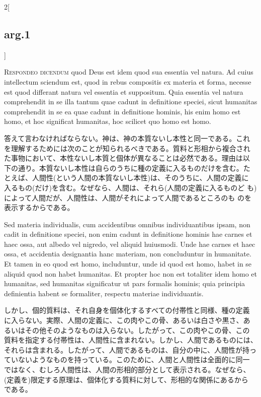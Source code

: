 \documentclass[paper=a4paper,fontsize=10pt,jafontsize=9pt,titlepage]{jlreq}
\begin{document}
\begin{paracol}{2}[\subsection{arg.1}]

\textsc{Respondeo dicendum} quod Deus est idem quod sua essentia vel
natura.  Ad cuius intellectum sciendum est, quod in rebus compositis
ex materia et forma, necesse est quod differant natura vel essentia et
suppositum.  Quia essentia vel natura comprehendit in se illa tantum
quae cadunt in definitione speciei, sicut humanitas comprehendit in se
ea quae cadunt in definitione hominis, his enim homo est homo, et hoc
significat humanitas, hoc scilicet quo homo est homo.

\switchcolumn

答えて言わなければならない。神は、神の本質ないし本性と同一である。これ
を理解するためには次のことが知られるべきである。質料と形相から複合され
た事物において、本性ないし本質と個体が異なることは必然である。理由は以
下の通り。本質ないし本性は自らのうちに種の定義に入るものだけを含む。た
とえば、人間性(という人間の本質ないし本性)は、そのうちに、人間の定義に
入るもの(だけ)を含む。なぜなら、人間は、それら(人間の定義に入るものど
も)によって人間だが、人間性は、人間がそれによって人間であるところのも
のを表示するからである。

\switchcolumn*

Sed materia individualis, cum accidentibus omnibus individuantibus
ipsam, non cadit in definitione speciei, non enim cadunt in
definitione hominis hae carnes et haec ossa, aut albedo vel nigredo,
vel aliquid huiusmodi.  Unde hae carnes et haec ossa, et accidentia
designantia hanc materiam, non concluduntur in humanitate.  Et tamen
in eo quod est homo, includuntur, unde id quod est homo, habet in se
aliquid quod non habet humanitas.  Et propter hoc non est totaliter
idem homo et humanitas, sed humanitas significatur ut pars formalis
hominis; quia principia definientia habent se formaliter, respectu
materiae individuantis.

\switchcolumn

しかし、個的質料は、それ自身を個体化するすべての付帯性と同様、種の定義
に入らない。実際、人間の定義に、この肉やこの骨、あるいは白さや黒さ、あ
るいはその他そのようなものは入らない。したがって、この肉やこの骨、この
質料を指定する付帯性は、人間性に含まれない。しかし、人間であるものには、
それらは含まれる。したがって、人間であるものは、自分の中に、人間性が持っ
ていないようなものを持っている。このために、人間と人間性は全面的に同一
ではなく、むしろ人間性は、人間の形相的部分として表示される。なぜなら、
(定義を)限定する原理は、個体化する質料に対して、形相的な関係にあるから
である。


\end{paracol}
\end{document}
